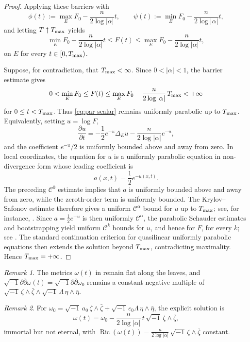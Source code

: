 \documentclass[12pt]{amsart}
\numberwithin{equation}{section}
\theoremstyle{remark}
\newtheorem{remark}{Remark}
\theoremstyle{definition}
\begin{document}
\begin{proof}
Applying these barriers with
$$ \phi(t) := \max_E F_0 - \frac{n}{2\log|\alpha|} t, \qquad \psi(t) := \min_E F_0 - \frac{n}{2\log|\alpha|} t, $$
and letting $T\uparrow T_{\rm max}$ yields
$$ \min_E F_0 - \frac{n}{2\log|\alpha|} t \leq F(t) \leq \max_E F_0 - \frac{n}{2\log|\alpha|}t, $$
on $E$ for every $t\in[0,T_{\rm max})$.

Suppose, for contradiction, that $T_{\rm max}<\infty$. Since $0<|\alpha|<1$, the barrier estimate gives
$$0<\min_E F_0\leq F(t)\leq \max_E F_0-\frac{n}{2\log|\alpha|}\,T_{\rm max}<+\infty$$
for $0\leq t<T_{\rm max}$. Thus \eqref{eq:par-scalar} remains uniformly parabolic up to $T_{\rm max}$. Equivalently, setting $u=\log F$,
$$\frac{\partial u}{\partial t}=-\frac12e^{-u}\Delta_Eu-\frac{n}{2\log|\alpha|}e^{-u},$$
and the coefficient $e^{-u}/2$ is uniformly bounded above and away from zero.
In local coordinates, the equation for $u$ is a uniformly parabolic equation in non-divergence form whose leading coefficient is
$$
a(x,t)=\frac12e^{-u(x,t)}.
$$
The preceding $\mathcal C^0$ estimate implies that $a$ is uniformly bounded above and away from zero, while the zeroth-order term is uniformly bounded. The Krylov--Safonov estimate therefore gives a uniform $\mathcal C^\alpha$ bound for $u$ up to $T_{\rm max}$; see, for instance, \cite[Chapter~IV]{lieberman}. Since $a=\frac12e^{-u}$ is then uniformly $\mathcal C^\alpha$, the parabolic Schauder estimates and bootstrapping yield uniform $\mathcal C^k$ bounds for $u$, and hence for $F$, for every $k$; see \cite[Chapter~V]{lieberman}. The standard continuation criterion for quasilinear uniformly parabolic equations then extends the solution beyond $T_{\rm max}$, contradicting maximality. Hence $T_{\rm max}=+\infty$.
\end{proof}


\begin{remark}
The metrics $\omega(t)$ in  remain flat along the leaves, and $\sqrt{-1}\partial\overline\partial\omega(t)=\sqrt{-1}\partial\overline\partial\omega_0$ remains a constant negative multiple of $\sqrt{-1}\,\zeta\wedge\bar\zeta\wedge\sqrt{-1}\,\Lambda\,\eta\wedge\bar\eta$.
\end{remark}

\begin{remark}
For $\omega_0=\sqrt{-1}\,a_0\,\zeta\wedge\bar\zeta+\sqrt{-1}\,c_0\Lambda\,\eta\wedge\bar\eta$, the explicit solution is
$$ \omega(t) = \omega_0 - \frac{n}{2\log|\alpha|}\,t\, \sqrt{-1}\,\zeta\wedge\bar\zeta, $$
immortal but not eternal, with $\operatorname{Ric}(\omega(t))=\frac{n}{2\log|\alpha|} \, \sqrt{-1}\,\zeta\wedge\bar\zeta$ constant.
\end{remark}
\end{document}
